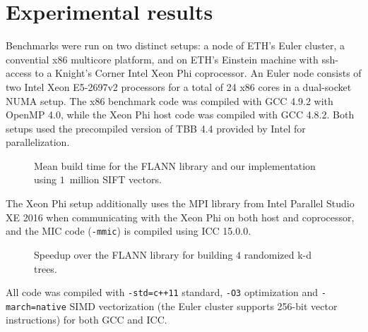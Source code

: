 \section{Experimental results}\sloppy
  \label{sec:exp}


  Benchmarks were run on two distinct setups: a node of ETH's Euler cluster, 
  a convential x86 multicore platform, and on ETH's Einstein machine with 
  ssh-access to a Knight's Corner Intel Xeon Phi coprocessor. An Euler node 
  consists of two Intel Xeon E5-2697v2 processors for a total of 24 x86 cores 
  in a dual-socket NUMA setup. The x86 benchmark code was compiled with GCC 
  4.9.2 with OpenMP 4.0, while the Xeon Phi host code was compiled with GCC 
  4.8.2. Both setups used the precompiled version of TBB 4.4 provided by Intel for parallelization.
  \begin{figure}[tb]
    \centering
    \resizebox{\columnwidth}{!}{}
    \caption{Mean build time for the FLANN library and our implementation using 
    $1$~million SIFT vectors.}
    \label{fig:build_comparison}
  \end{figure}
  The Xeon Phi setup additionally uses the MPI library from Intel Parallel 
  Studio XE 2016 when communicating with the Xeon Phi on both host and 
  coprocessor, and the MIC code (\texttt{-mmic}) is compiled using ICC 15.0.0.  
  \begin{figure}[tb]
    \centering
    \resizebox{\columnwidth}{!}{}
    \caption{Speedup over the FLANN library for building $4$ randomized k-d 
    trees.}
    \label{fig:build_speedup}
  \end{figure}
  All code was compiled with \texttt{-std=c++11} standard, \texttt{-O3} 
  optimization and \texttt{-march=native} SIMD vectorization (the Euler cluster supports 256-bit vector instructions) for both GCC and 
  ICC. %

